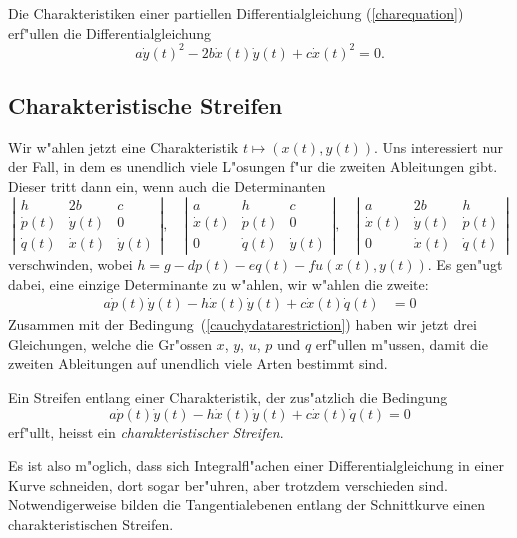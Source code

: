 \begin{satz}
\label{charakteristikendgl}
Die Charakteristiken einer partiellen Differentialgleichung (\ref{charequation})
erf"ullen  die Differentialgleichung
\[
a\dot y(t)^2-2b\dot x(t)\dot y(t)+c\dot x(t)^2=0.
\]
\end{satz}

\subsection{Charakteristische Streifen}
Wir w"ahlen jetzt eine Charakteristik $t\mapsto(x(t),y(t))$.
Uns interessiert nur der Fall, in dem es unendlich viele
L"osungen f"ur die zweiten Ableitungen gibt. Dieser tritt dann
ein, wenn auch die Determinanten
\[
\left|
\begin{matrix}
h&2b&c\\
\dot p(t)&\dot y(t)&0\\
\dot q(t)&\dot x(t)&\dot y(t)
\end{matrix}
\right|
,
\quad
\left|
\begin{matrix}
a&h&c\\
\dot x(t)&\dot p(t)&0\\
0&\dot q(t)&\dot y(t)
\end{matrix}
\right|
,
\quad
\left|
\begin{matrix}
a&2b&h\\
\dot x(t)&\dot y(t)&\dot p(t)\\
0&\dot x(t)&\dot q(t)
\end{matrix}
\right|
\]
verschwinden, wobei $h=g-dp(t)-eq(t)-fu(x(t),y(t))$.
Es gen"ugt dabei, eine einzige Determinante zu w"ahlen,
wir w"ahlen die zweite:
\begin{align*}
a\dot p(t)\dot y(t)-h\dot x(t)\dot y(t)+c\dot x(t)\dot q(t)&=0
\end{align*}
Zusammen mit der Bedingung~(\ref{cauchydatarestriction})
haben wir jetzt drei Gleichungen, welche die Gr"ossen 
$x$, $y$, $u$, $p$ und $q$ erf"ullen m"ussen, damit die zweiten
Ableitungen auf unendlich viele Arten bestimmt sind.

\begin{definition}
Ein Streifen entlang einer Charakteristik, der zus"atzlich die
Bedingung 
\[
a\dot p(t)\dot y(t)-h\dot x(t)\dot y(t)+c\dot x(t)\dot q(t)=0
\]
erf"ullt, heisst ein {\em charakteristischer Streifen}.
\end{definition}

Es ist also m"oglich, dass sich Integralfl"achen einer Differentialgleichung
in einer Kurve schneiden, dort sogar ber"uhren, aber trotzdem verschieden
sind. Notwendigerweise bilden die Tangentialebenen
entlang der Schnittkurve einen charakteristischen Streifen.


